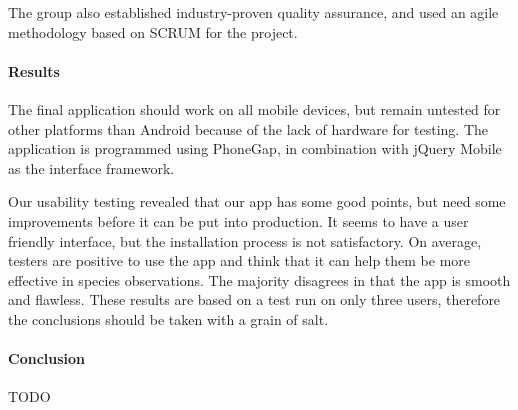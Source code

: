 The group also established industry-proven quality assurance, and used an agile
methodology based on SCRUM for the project. 

\paragraph{Results}
The final application should work on all mobile devices, but remain untested for
other platforms than Android because of the lack of hardware for testing. The
application is programmed using PhoneGap, in combination with jQuery Mobile as the
interface framework.

Our usability testing revealed that our app has some good points, but need some
improvements before it can be put into production. It seems to have a user
friendly interface, but the installation process is not satisfactory. On
average, testers are positive to use the app and think that it can help them be
more effective in species observations. The majority disagrees in that the app
is smooth and flawless. These results are based on a test run on only three users,
therefore the conclusions should be taken with a grain of salt.

\paragraph{Conclusion}
TODO


